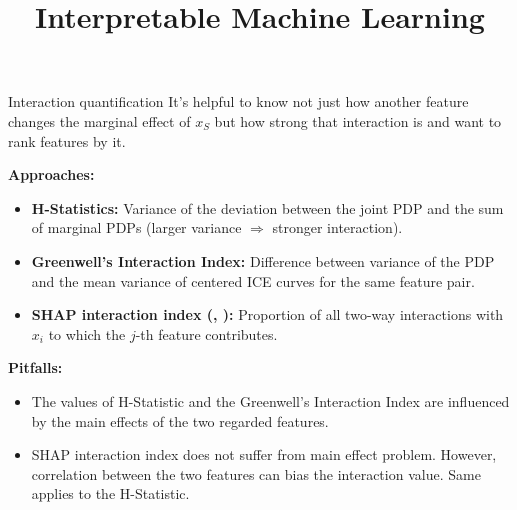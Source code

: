 \documentclass[10pt,compress,t,notes=noshow, xcolor=table]{beamer}
\title{Interpretable Machine Learning}
\date{}
\begin{document}


\begin{frame}{Interaction quantification}
It's helpful to know not just how another feature changes the marginal effect of $x_S$ but how strong that interaction is and want to rank features by it.

\textbf{Approaches:}
\begin{itemize}
    \item \textbf{H-Statistics:} Variance of the deviation between the joint PDP and the sum of marginal PDPs (larger variance $\Rightarrow$ stronger interaction).
    \item \textbf{Greenwell’s Interaction Index:} Difference between variance of the PDP and the mean variance of centered ICE curves for the same feature pair.
    \item \textbf{SHAP interaction index (, ):} Proportion of all two-way interactions with $x_i$  to which the $j$-th feature contributes.
\end{itemize}

\pause

\textbf{Pitfalls:}
\begin{itemize}
    \item The values of H-Statistic and the Greenwell’s Interaction Index are influenced by the
 main effects of the two regarded features.
    \item SHAP interaction index does not suffer from main effect problem. However, correlation between the two features can bias the interaction value. Same applies to the H-Statistic.  
\end{itemize}

\end{frame}
\end{document}
